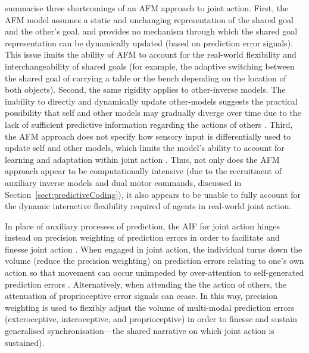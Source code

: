 \textcite{Pesquita2017} summarise three shortcomings of an AFM approach to joint action.  First, the AFM model assumes a static and unchanging representation of the shared goal and the other's goal, and provides no mechanism through which the shared goal representation can be dynamically updated (based on prediction error signals).  This issue limits the ability of AFM to account for the real-world flexibility and interchangeability of shared goals (for example, the adaptive switching between the shared goal of carrying a table or the bench depending on the location of both objects).  Second, the same rigidity applies to other-inverse models.  The inability to directly and dynamically update other-models suggests the practical possibility that self and other models may gradually diverge over time due to the lack of sufficient predictive information regarding the actions of others \citep{Pickering2014}. Third, the AFM approach does not specify how sensory input is differentially used to update self and other models, which limits the model's ability to account for learning and adaptation within joint action \citep{Pesquita2017}.  Thus, not only does the AFM approach appear to be computationally intensive (due to the recruitment of auxiliary inverse models and dual motor commands, discussed in Section~\ref{sect:predictiveCoding}), it also appears to be unable to fully account for the dynamic interactive flexibility required of agents in real-world joint action.






In place of auxiliary processes of prediction, the AIF for joint action hinges instead on precision weighting of prediction errors in order to facilitate and finesse joint action \citep{Moutoussis2014,Friston2015}.  When engaged in joint action, the individual turns down the volume (reduce the precision weighting) on prediction errors relating to one's own action so that movement can occur unimpeded by over-attention to self-generated prediction errors \citep[an intuitive example of the opposite of this ideal scenario is a Skype call in which the flow of an individual's speech is interrupted by auditory feedback from the other receiver's device (feedback that would otherwise be attenuated by the speaker), see][]{Friston2015}.  Alternatively, when attending the the action of others, the attenuation of proprioceptive error signals can cease. In this way, precision weighting is used to flexibly adjust the volume of multi-modal prediction errors (exteroceptive, interoceptive, and proprioceptive) in order to finesse and sustain generalised synchronisation---the shared narrative on which joint action is sustained).

